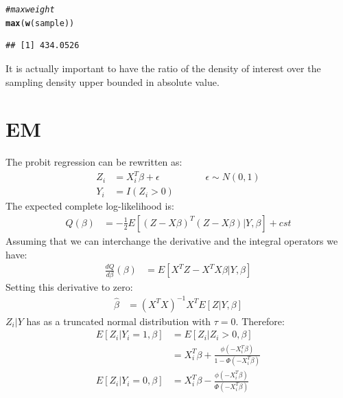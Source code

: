 \documentclass[11pt]{article}\usepackage[]{graphicx}\usepackage[]{color}
\makeatletter
\newcommand{\hlcom}[1]{\textcolor[rgb]{0.678,0.584,0.686}{\textit{#1}}}%
\newcommand{\hlstd}[1]{\textcolor[rgb]{0.345,0.345,0.345}{#1}}%
\newcommand{\hlkwd}[1]{\textcolor[rgb]{0.737,0.353,0.396}{\textbf{#1}}}%
\newenvironment{kframe}{%
 \def\at@end@of@kframe{}%
 \ifinner\ifhmode%
  \def\at@end@of@kframe{\end{minipage}}%
  \begin{minipage}{\columnwidth}%
 \fi\fi%
 \def\FrameCommand##1{\hskip\@totalleftmargin \hskip-\fboxsep
 \colorbox{shadecolor}{##1}\hskip-\fboxsep
     \hskip-\linewidth \hskip-\@totalleftmargin \hskip\columnwidth}%
 \MakeFramed {\advance\hsize-\width
   \@totalleftmargin\z@ \linewidth\hsize
   \@setminipage}}%
 {\par\unskip\endMakeFramed%
 \at@end@of@kframe}
\newenvironment{knitrout}{}{} %
\makeatother
\begin{document}
\begin{knitrout}
\color{fgcolor}\begin{kframe}
\begin{alltt}
\hlcom{#maxweight}
\hlkwd{max}\hlstd{(}\hlkwd{w}\hlstd{(sample))}
\end{alltt}
\begin{verbatim}
## [1] 434.0526
\end{verbatim}
\end{kframe}
\end{knitrout}
It is actually important to have the ratio of the density of interest over the sampling density upper bounded in absolute value.

\section{EM}
The probit regression can be rewritten as:
\begin{align}
Z_i&=X_i^T\beta+\epsilon \hspace{2cm} \epsilon  \sim N(0,1)
\nonumber\\%
Y_i&=I(Z_i>0)
\end{align}
\noindent
The expected complete log-likelihood is:
\begin{align}
Q(\beta)&=-\frac{1}{2}E[ (Z-X\beta)^T(Z-X\beta)|Y,\beta] + cst
\end{align}
Assuming that we can interchange the derivative and the integral operators we have:
\begin{align}
\frac{dQ}{d \beta}(\beta)&=E[ X^T Z-X^TX \beta|Y,\beta]
\end{align}
Setting this derivative to zero:
\begin{align}
\hat{\beta} &=(X^T X)^{-1}X^TE[Z|Y,\beta]
\end{align}
\noindent
$Z_i|Y$ has as a truncated normal distribution with $\tau=0$. Therefore:
\begin{align}
E[Z_i|Y_i=1,\beta]&=E[Z_i|Z_i>0,\beta]
\nonumber\\%
&=X_i^T\beta+\frac{\phi(-X_i^T\beta)}{1-\Phi(-X_i^T\beta)}
\nonumber\\%
E[Z_i|Y_i=0,\beta]&=X_i^T\beta-\frac{\phi(-X_i^T\beta)}{\Phi(-X_i^T\beta)}
\nonumber\\%
\end{align}
\end{document}
